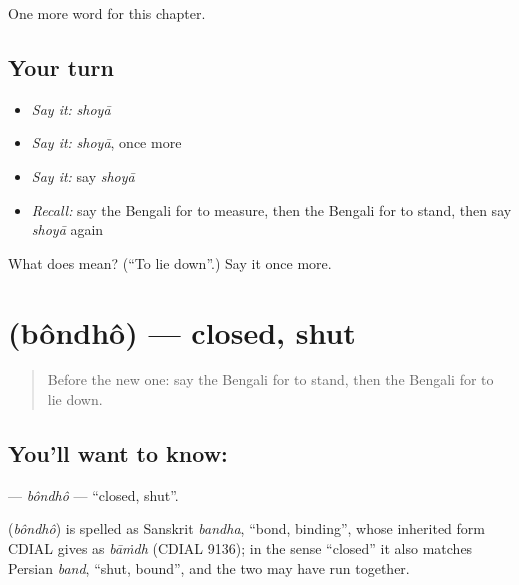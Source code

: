 \begin{grammarlens}[title={What you've built}]
One more word for this chapter.
\end{grammarlens}

\subsection*{Your turn}
\begin{itemize}
\raggedright
  \item \emph{Say it:} \emph{shoyā}
  \item \emph{Say it:} \emph{shoyā}, once more
  \item \emph{Say it:} say \emph{shoyā}
  \item \emph{Recall:} say the Bengali for to measure, then the Bengali for to stand, then say \emph{shoyā} again
\end{itemize}

\begin{tcolorbox}[breakable,colback=teal!4,colframe=teal!35!black,title={Before you move on}]
What does  mean? (\textquotedblleft{}To lie down\textquotedblright{}.) Say it once more.
\end{tcolorbox}
\section[\texorpdfstring{\bn{বন্ধ} (bôndhô)}{বন্ধ (bôndhô)}]{ (bôndhô) — closed, shut}

\label{lesson:BN-C104-bondho}



\begin{quote}
Before the new one: say the Bengali for to stand, then the Bengali for to lie down.
\end{quote}

\subsection*{You'll want to know: }
\textbf{} — \emph{bôndhô} — \textquotedblleft{}closed, shut\textquotedblright{}.

\begin{cousinweb}
\textbf{} (\emph{bôndhô}) is spelled as Sanskrit \emph{bandha}, \textquotedblleft{}bond, binding\textquotedblright{}, whose inherited form CDIAL gives as \emph{bāṁdh} (CDIAL 9136); in the sense \textquotedblleft{}closed\textquotedblright{} it also matches Persian \emph{band}, \textquotedblleft{}shut, bound\textquotedblright{}, and the two may have run together.
\end{cousinweb}

